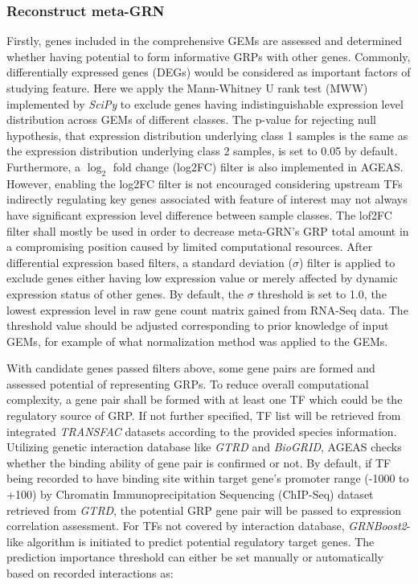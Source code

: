 \documentclass[fleqn,10pt]{wlscirep}
\begin{document}
    \subsubsection*{Reconstruct meta-GRN}
      Firstly, genes included in the comprehensive GEMs are assessed and determined whether having potential to form informative GRPs with other genes.
      Commonly, differentially expressed genes (DEGs) would be considered as important factors of studying feature.
      Here we apply the Mann-Whitney U rank test (MWW) implemented by \emph{SciPy}\cite{2020SciPy-NMeth} to exclude genes having indistinguishable expression level distribution across GEMs of different classes.
      The p-value for rejecting null hypothesis, that expression distribution underlying class 1 samples is the same as the expression distribution underlying class 2 samples, is set to 0.05 by default.
      Furthermore, a $\log_2$ fold change (log2FC) filter is also implemented in AGEAS.
      However, enabling the log2FC filter is not encouraged considering upstream TFs indirectly regulating key genes associated with feature of interest may not always have significant expression level difference between sample classes.
      The lof2FC filter shall mostly be used in order to decrease meta-GRN's GRP total amount in a compromising position caused by limited computational resources.
      After differential expression based filters, a standard deviation ($\sigma$) filter is applied to exclude genes either having low expression value or merely affected by dynamic expression status of other genes.
      By default, the $\sigma$ threshold is set to 1.0, the lowest expression level in raw gene count matrix gained from RNA-Seq data.
      The threshold value should be adjusted corresponding to prior knowledge of input GEMs, for example of what normalization method was applied to the GEMs.

      With candidate genes passed filters above, some gene pairs are formed and assessed potential of representing GRPs.
      To reduce overall computational complexity, a gene pair shall be formed with at least one TF which could be the regulatory source of GRP.
      If not further specified, TF list will be retrieved from integrated \emph{TRANSFAC}\cite{transfac} datasets according to the provided species information.
      Utilizing genetic interaction database like \emph{GTRD}\cite{gkaa1057} and \emph{BioGRID}\cite{biogrid}, AGEAS checks whether the binding ability of gene pair is confirmed or not.
      By default, if TF being recorded to have binding site within target gene's promoter range (-1000 to +100) by Chromatin Immunoprecipitation Sequencing (ChIP-Seq) dataset retrieved from \emph{GTRD}\cite{gkaa1057}, the potential GRP gene pair will be passed to expression correlation assessment.
      For TFs not covered by interaction database, \emph{GRNBoost2}\cite{grnboost2}-like algorithm is initiated to predict potential regulatory target genes.
      The prediction importance threshold can either be set manually or automatically based on recorded interactions as:
\end{document}
